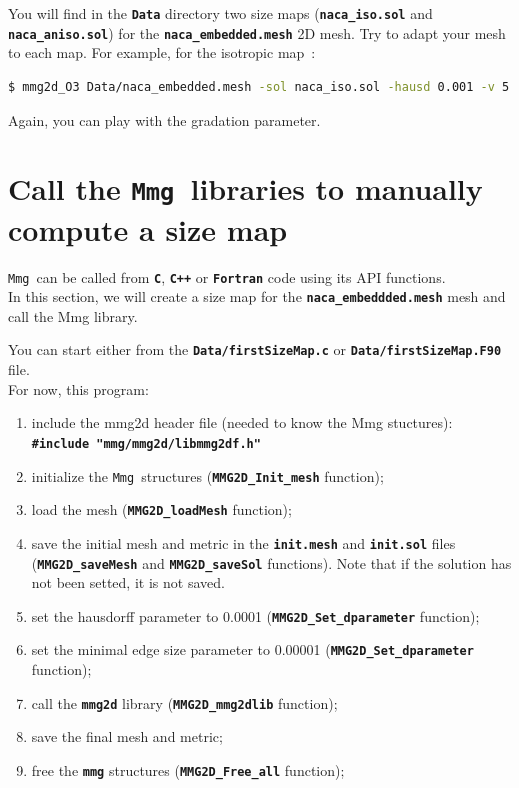 \documentclass{article}
\newcommand{\ttb}[1]{\texttt{\textbf{#1}}}
\newcommand{\mmg}{\texttt{Mmg}}
\begin{document}
\begin{figure}
\centering

\end{figure}


You will find in the \ttb{Data} directory two size maps (\ttb{naca\_iso.sol} and
\ttb{naca\_aniso.sol}) for the
\ttb{naca\_embedded.mesh} 2D mesh. Try to adapt your mesh to each map. For
example, for the isotropic map~:
\begin{lstlisting}[language=bash]
$ mmg2d_O3 Data/naca_embedded.mesh -sol naca_iso.sol -hausd 0.001 -v 5
\end{lstlisting}

Again, you can play with the gradation parameter.

\section{Call the \mmg\ libraries to manually compute a size map}
\mmg\ can be called from \ttb{C}, \ttb{C++} or \ttb{Fortran} code
using its API functions.\\

In this section, we will create a size map for the
\ttb{naca\_embeddded.mesh} mesh and call the Mmg library.

 You can
start either from the \ttb{Data/firstSizeMap.c} or
\ttb{Data/firstSizeMap.F90} file.\\
 For now, this program:
\begin{enumerate}
\item include the mmg2d header file (needed to know the Mmg stuctures):\\
\ttb{\#include "mmg/mmg2d/libmmg2df.h"}

\item initialize the \mmg\ structures (\ttb{MMG2D\_Init\_mesh} function);
\item load the mesh (\ttb{MMG2D\_loadMesh} function);
\item save the initial mesh and metric in the \ttb{init.mesh} and
  \ttb{init.sol} files (\ttb{MMG2D\_saveMesh} and \ttb{MMG2D\_saveSol}
  functions). Note that if the solution has not been setted, it is not saved.
\item set the hausdorff parameter to 0.0001 (\ttb{MMG2D\_Set\_dparameter} function);
\item set the minimal edge size parameter to 0.00001 (\ttb{MMG2D\_Set\_dparameter} function);
\item call the \ttb{mmg2d} library (\ttb{MMG2D\_mmg2dlib} function);
\item save the final mesh and metric;
\item free the \ttb{mmg} structures (\ttb{MMG2D\_Free\_all} function);\\
\end{enumerate}
\end{document}
